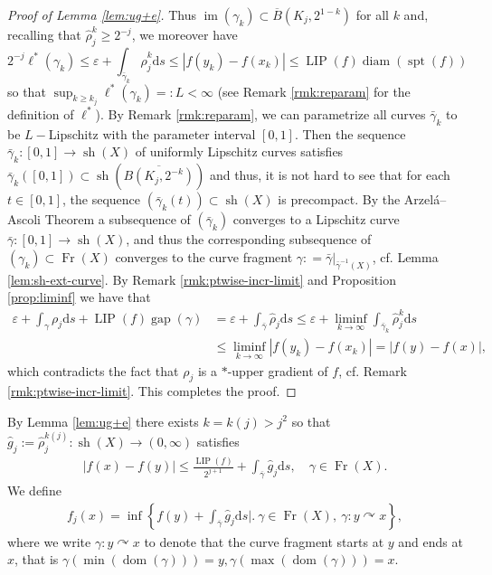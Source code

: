\documentclass{amsart}
\numberwithin{equation}{section}
\newcommand{\spt}{\operatorname{spt}}
\newcommand{\diam}{\operatorname{diam}}
\newcommand{\LIP}{\operatorname{LIP}}
\newcommand{\im}{\operatorname{im}}
\newcommand{\gap}{\operatorname{gap}}
\newcommand{\dom}{\operatorname{dom}}
\newcommand{\Fr}{\operatorname{Fr}}
\newcommand{\sh}{\operatorname{sh}}
\newcommand{\ud}{\mathrm {d}}
\newcommand{\inv}{^{-1}}
\newcommand{\defl}{\mathrel{\mathop:}=}
\newcommand{\defr}{=\mathrel{\mathop:}}
\begin{document}
\begin{proof}[Proof of Lemma \ref{lem:ug+e}]
Thus $\im(\gamma_k)\subset \overline B(K_j,2^{1-k})$ for all $k$ and, recalling that $\widehat \rho_j^k\ge 2^{-j}$, we moreover have 
\[
2^{-j}\ell^\ast(\gamma_k)\le \varepsilon+\int_{\bar\gamma_k}\hat\rho_{j}^{k}\ud s\le |f(y_k)-f(x_k)|\le \LIP(f)\diam(\spt(f))
\]
so that $\sup_{k\geq k_j}\ell^\ast(\gamma_k)\defr L<\infty$ (see Remark \ref{rmk:reparam} for the definition of $\ell^*$). By Remark \ref{rmk:reparam}, we can parametrize all curves $\bar \gamma_k$ to be $L-$Lipschitz with the parameter interval $[0,1]$. 
Then the sequence $\bar\gamma_k:[0,1]\to \sh(X)$ of uniformly Lipschitz curves satisfies $\bar\gamma_k([0,1])\subset \sh(\overline{B(K_j,2^{-k})})$ and thus, it is not hard to see that for each $t\in [0,1]$, the sequence $(\bar\gamma_k(t))\subset \sh(X)$ is precompact. By the Arzel\'a--Ascoli Theorem \cite[Theorem 10.28]{hei01} a subsequence of $(\bar\gamma_k)$ converges to a Lipschitz curve $\bar\gamma:[0,1]\to \sh(X)$, and thus the corresponding subsequence of $(\gamma_k)\subset \Fr(X)$ converges to the curve fragment $\gamma\defl \bar\gamma|_{\bar\gamma\inv(X)}$, cf. Lemma \ref{lem:sh-ext-curve}. By Remark \ref{rmk:ptwise-incr-limit} and Proposition \ref{prop:liminf} we have that
\begin{align*}
\varepsilon+\int_\gamma\rho_j\ud s+\LIP(f)\gap(\gamma)&=\varepsilon+\int_{\bar\gamma}\hat\rho_j\ud s\le \varepsilon+\liminf_{k\to\infty}\int_{\bar\gamma_k}\hat\rho_{j}^{k}\ud s\\
&\le \liminf_{k\to\infty}|f(y_k)-f(x_k)|=|f(y)-f(x)|,
\end{align*}
which contradicts the fact that $\rho_j$ is a $\ast$-upper gradient of $f$, cf. Remark \ref{rmk:ptwise-incr-limit}. This completes the proof. 
\end{proof}



By Lemma \ref{lem:ug+e} there exists $k=k(j)>j^2$ so that  $\hat g_j:=\widehat\rho_j^{k(j)}:\sh(X)\to (0,\infty)$ satisfies
\begin{align}\label{eq:ug+e}
|f(x)-f(y)|\le \frac{\LIP(f)}{2^{j+1}}+\int_{\overline\gamma}\hat g_j\ud s,\quad \gamma\in\Fr(X).
\end{align}
We define
\begin{align*}
f_j(x)=\inf\left\{ f(y)+\int_{\overline\gamma}\hat g_j\ud s\Big|\Big.\ \gamma\in\Fr(X),\ \gamma:y\curvearrowright x\right\},
\end{align*}
where we write $\gamma:y\curvearrowright x$ to denote that the curve fragment starts at $y$ and ends at $x$, that is $\gamma(\min(\dom(\gamma)))=y,\gamma(\max(\dom(\gamma)))=x$.
\end{document}
